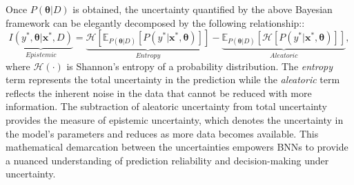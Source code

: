 Once $P(\boldsymbol{\theta}|D)$ is obtained, the uncertainty quantified by the above Bayesian framework can be elegantly decomposed by the following relationship:\cite{depeweg2018decomposition}:
\begin{equation}
\label{eq:Bayes_AU_EU_decomp}
    \underbrace{I(y^*, \boldsymbol{\theta} | \mathbf{x}^*, D)}_{Epistemic} = \underbrace{\mathcal{H}\left[ \mathbb{E}_{P(\boldsymbol{\theta}|D)}\left[P(y^*|\mathbf{x}^*, \boldsymbol{\theta})\right]\right]}_{Entropy} - \underbrace{\mathbb{E}_{P(\boldsymbol{\theta}|D)}\left[\mathcal{H}\left[P(y^*|\mathbf{x}^*, \boldsymbol{\theta})\right]\right]}_{Aleatoric},
\end{equation}
where $\mathcal{H}(\cdot)$ is Shannon’s entropy of a probability distribution.
The \textit{entropy} term represents the total uncertainty in the prediction while the \textit{aleatoric} term reflects the inherent noise in the data that cannot be reduced with more information. 
The subtraction of aleatoric uncertainty from total uncertainty provides the measure of epistemic uncertainty, which denotes the uncertainty in the model's parameters and reduces as more data becomes available. 
This mathematical demarcation between the uncertainties empowers BNNs to provide a nuanced understanding of prediction reliability and decision-making under uncertainty.

